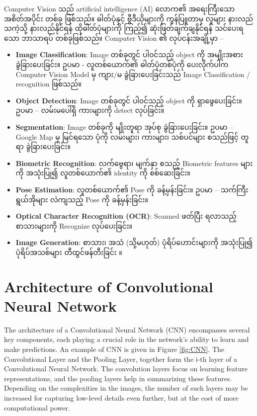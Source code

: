 Computer Vision သည် artificial intelligence (AI) လောက၏ အရေးကြီးသော အစိတ်အပိုင်း တစ်ခု ဖြစ်သည်။ ဓါတ်ပုံနှင့် ဗွီဒီယိုများကို ကွန်ပြူတာမှ လူများ နားလည်သကဲ့သို့ နားလည်နိုင်ရန် ထိုဓါတ်ပုံများကို ကြည့်၍ ဆုံးဖြတ်ချက်ချနိုင်ရန် သင်ပေးရသော ဘာသာရပ် တစ်ခုဖြစ်သည်။ Computer Vision ၏ လုပ်ငန်းအချို့မှာ -- 
\begin{itemize}
    \item \textbf{Image Classification}: Image တစ်ခုတွင် ပါ၀င်သည့် object ကို အမျိုးအစား ခွဲခြားပေးခြင်း။  ဥပမာ - လူတစ်ယောက်၏ ဓါတ်ပုံတစ်ပုံကို ပေးလိုက်ပါက Computer Vision Model မှ ကျား/မ ခွဲခြားပေးခြင်းသည် Image Classification / recognition ဖြစ်သည်။ 
    \item \textbf{Object Detection}: Image တစ်ခုတွင် ပါ၀င်သည့် object ကို ရှာဖွေပေးခြင်း။ ဥပမာ -- လမ်းမပေါ်ရှိ ကားများကို detect လုပ်ခြင်း။ 
    \item \textbf{Segmentation}: Image တစ်ခုကို မျိုးတူရာ အုပ်စု ခွဲခြားပေးခြင်း။ ဥပမာ -- Google Map မှ မြင်ရသော ပုံကို လမ်းများ၊ ကားများ၊ သစ်ပင်များ စသည်ဖြင့် တူရာ ခွဲခြားပေးခြင်း။ 
    \item \textbf{Biometric Recognition}:  လက်ဗွေရာ၊ မျက်နှာ စသည့် Biometric features များကို အသုံးပြု၍ လူတစ်ယောက်၏ identity ကို စစ်ဆေးခြင်း။ 
    \item \textbf{Pose Estimation}: လူတစ်ယောက်၏ Pose ကို ခန့်မှန်းခြင်း။ ဥပမာ -- သက်ကြီးရွယ်အိုများ လဲကျသည့် Pose ကို ခန့်မှန်းခြင်း။ 
    \item \textbf{Optical Character Recognition (OCR)}: Scanned ဖတ်ပြီး ရလာသည့် စာသားများကို Recognize လုပ်ပေးခြင်း။ 
    \item \textbf{Image Generation}: စာသား၊  အသံ (သို့မဟုတ်) ပုံရိပ်ဟောင်းများကို အသုံးပြု၍ ပုံရိပ်အသစ်များ တီထွင်ဖန်တီးခြင်း ။ 
    \end{itemize}

\newpage
\section{Architecture of Convolutional Neural Network}\label{CNN_architecture}

The architecture of a Convolutional Neural Network (CNN) encompasses several key components, each playing a crucial role in the network's ability to learn and make predictions. An example of CNN is given in Figure \ref{fig:CNN}. The Convolutional Layer and the Pooling Layer, together form the i-th layer of a Convolutional Neural Network. The convolution layers focus on learning feature representations, and the pooling layers help in summarizing these features. Depending on the complexities in the images, the number of such layers may be increased for capturing low-level details even further, but at the cost of more computational power. 


